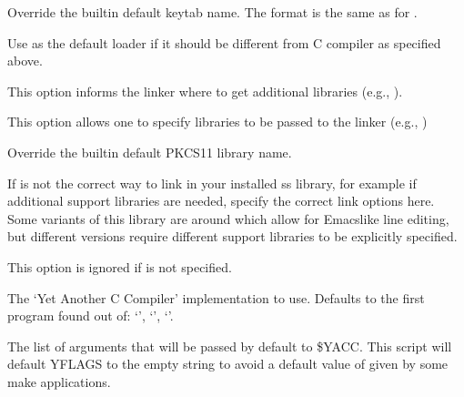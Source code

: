 \documentclass[letterpaper,10pt,english]{sphinxmanual}
\begin{document}
\begin{description}
\sphinxAtStartPar
Override the built\sphinxhyphen{}in default keytab name.
The format is the same as for .

\sphinxAtStartPar
Use  as the default loader if it should be different from
C compiler as specified above.

\sphinxAtStartPar
This option informs the linker where to get additional libraries
(e.g., ).

\sphinxAtStartPar
This option allows one to specify libraries to be passed to the
linker (e.g., )

\sphinxAtStartPar
Override the built\sphinxhyphen{}in default PKCS11 library name.

\sphinxAtStartPar
If  is not the correct way to link in your installed ss
library, for example if additional support libraries are needed,
specify the correct link options here.  Some variants of this
library are around which allow for Emacs\sphinxhyphen{}like line editing, but
different versions require different support libraries to be
explicitly specified.

\sphinxAtStartPar
This option is ignored if \sphinxstylestrong{\sphinxhyphen{}} is not specified.

\sphinxAtStartPar
The ‘Yet Another C Compiler’ implementation to use. Defaults to
the first program found out of: ‘’, ‘’,
‘’.

\sphinxAtStartPar
The list of arguments that will be passed by default to \$YACC.
This script will default YFLAGS to the empty string to avoid a
default value of  given by some make applications.

\end{description}
\end{document}
